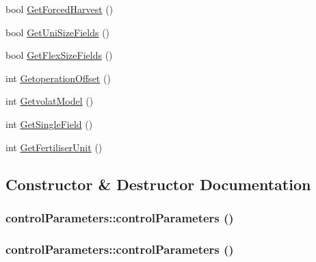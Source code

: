 \begin{DoxyCompactItemize}
\item 
bool \hyperlink{classcontrol_parameters_aef19039d66ec9aafcc7c668dd7f50e29}{GetForcedHarvest} ()
\item 
bool \hyperlink{classcontrol_parameters_a1c35d1b5f556e75782eb0aa4fb87d063}{GetUniSizeFields} ()
\item 
bool \hyperlink{classcontrol_parameters_a24ac14f6b6a328d5fef572a44d005b46}{GetFlexSizeFields} ()
\item 
int \hyperlink{classcontrol_parameters_acff95f57e2cafa75d859bbee183e022c}{GetoperationOffset} ()
\item 
int \hyperlink{classcontrol_parameters_a26f96adcae0f550b87e320b6106e3367}{GetvolatModel} ()
\item 
int \hyperlink{classcontrol_parameters_af8b3337c8b5a01fc8608f896fcf1d71c}{GetSingleField} ()
\item 
int \hyperlink{classcontrol_parameters_a62f2ca9fc634e6bd4203a583f2f50530}{GetFertiliserUnit} ()
\end{DoxyCompactItemize}


\subsection{Constructor \& Destructor Documentation}
\hypertarget{classcontrol_parameters_a2acc732d4c073abc5f69df32d2aa0006}{
\subsubsection[{controlParameters}]{\setlength{\rightskip}{0pt plus 5cm}controlParameters::controlParameters ()}}
\label{classcontrol_parameters_a2acc732d4c073abc5f69df32d2aa0006}
\hypertarget{classcontrol_parameters_a2acc732d4c073abc5f69df32d2aa0006}{
\subsubsection[{controlParameters}]{\setlength{\rightskip}{0pt plus 5cm}controlParameters::controlParameters ()}}
\label{classcontrol_parameters_a2acc732d4c073abc5f69df32d2aa0006}


